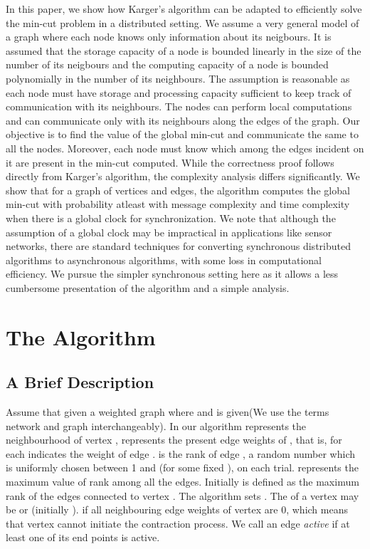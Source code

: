 \documentclass{acm_proc_article-sp}
\begin{document}
In this paper, we show how Karger's algorithm\cite{NRMM97} can be
adapted to efficiently solve the min-cut problem in a distributed
setting.  We assume a very general model of a graph where each node
knows only information about its neigbours. It is assumed that the
storage capacity of a node is bounded linearly in the size of the
number of its neigbours and  the computing capacity of a node is
bounded polynomially in the number of its neighbours. The assumption
is reasonable as each node must have storage and processing
capacity sufficient to keep track of communication with its neighbours.
The nodes can perform local computations and can communicate only with
its neighbours along the edges of the graph.  Our objective is to find
the value of the global min-cut and communicate the same to all the
nodes.  Moreover, each node must know which among the edges incident
on it are present in the min-cut computed. While the correctness proof follows directly from Karger's algorithm, the complexity analysis differs significantly. We show that  for a graph
of  vertices and  edges, the algorithm computes the global
min-cut with probability atleast 
with  message complexity and  time complexity when
there is a global clock for synchronization.  We note that although
the assumption of a global clock may be impractical in applications
like sensor networks, there are standard techniques for converting
synchronous distributed algorithms to asynchronous algorithms, with
some loss in computational efficiency\cite{JHDS96}. We pursue the simpler synchronous setting here
as it allows a less cumbersome  presentation of the algorithm and a
simple analysis.

\section{The Algorithm}

\subsection{A Brief Description}
Assume that given a weighted graph  where  and  is given(We use the terms network and graph interchangeably). In our algorithm  represents the neighbourhood of vertex ,  represents the present edge weights of , that is, for each  indicates the weight of edge .  is the rank of edge , a random number which is uniformly chosen between 1 and (for some fixed ), on each trial.  represents the maximum value of rank among all the edges. Initially  is defined as the maximum rank of the edges connected to vertex . The algorithm sets . The  of a vertex may be  or  (initially ).  if all neighbouring edge weights of vertex  are 0, which means that vertex cannot initiate the contraction process.  We call an edge {\em active} if at least one of its end points is active.
\end{document}
